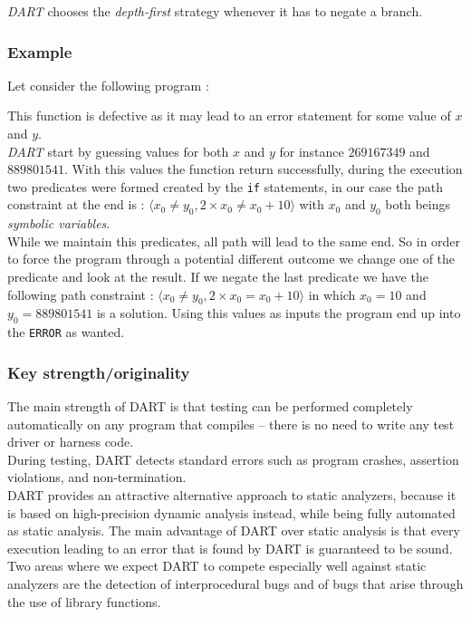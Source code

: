 \documentclass[11pt]{article}
\begin{document}
			\emph{DART} chooses the \emph{depth-first} strategy whenever it has to negate a branch.
	    
	    \subsubsection{Example}	
		    Let consider the following program :
		     
		    \begin{algorithm}
		    	
		    	
		    \end{algorithm}
	    	
	    	This function is defective as it may lead to an error statement for some value of $x$ and $y$.\\
	    	\emph{DART} start by guessing values for both $x$ and $y$ for instance $269167349$ and $889801541$. With this values the function return  successfully, during the execution two predicates were formed created by the \texttt{if} statements, in our case the path constraint at the end is : $\langle x_0 \neq y_0, 2 \times x_0 \neq x_0 + 10 \rangle$ with $x_0$ and $y_0$ both beings \emph{symbolic variables}.\\ %
	    	While we maintain this predicates, all path will lead to the same end. So in order to force  the program through a potential different outcome we change one of the predicate and look at the result. If we negate the last predicate we have the following path constraint : $\langle x_0 \neq y_0, 2 \times x_0 = x_0 + 10 \rangle$ in which $x_0=10$ and $y_0=889801541$ is a solution. Using this values as inputs the program end up into the \texttt{ERROR} as wanted.

	    \subsubsection{Key strength/originality}
	    	The main strength of DART is that testing can be performed completely automatically on any program that compiles – there is no need to write any test driver or harness code.\\
	    	During testing, DART detects standard errors such as program crashes, assertion violations, and non-termination.\\
	    	DART provides an attractive alternative approach to static analyzers, because it is based on high-precision dynamic analysis instead, while being fully automated as static analysis. The main advantage of DART over static analysis is that every execution leading to an error that is found by DART is guaranteed to be sound. Two areas where we expect DART to compete especially well against static analyzers are the detection of interprocedural bugs and of bugs that arise through the use of library functions.\\
\end{document}
